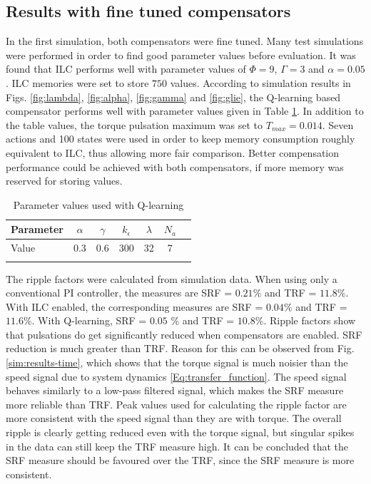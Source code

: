 \subsection{Results with fine tuned compensators} \label{Results with fine tuned compensators}
In the first simulation, both compensators were fine tuned. Many test simulations were performed in order to find good parameter values before evaluation. It was found that ILC performs well with parameter values of $\Phi = 9$, $\Gamma = 3$ and $\alpha = 0.05$. ILC memories were set to store $750$ values. According to simulation results in Figs. \ref{fig:lambda}, \ref{fig:alpha}, \ref{fig:gamma} and \ref{fig:glie}, the Q-learning based compensator performs well with parameter values given in Table  \ref{Tbl:Q-params}. In addition to the table values, the torque pulsation maximum was set to $T_{max}=0.014$. Seven actions and 100 states were used in order to keep memory consumption roughly equivalent to ILC, thus allowing more fair comparison. Better compensation performance could be achieved with both compensators, if more memory was reserved for storing values.

\begin{table}[b]
\caption{Parameter values used with Q-learning}
\centering
\begin{tabular}[t]{lcccccc}
\hline
Parameter    & $\alpha$ & $\gamma$ & $k_\epsilon$ & $\lambda$ & $N_a$\\
\hline
Value    & \num{0.3} & \num{0.6} &  \num{300} & \num{32} & \num{7}\\
\hline
\label{Tbl:Q-params}
\end{tabular}
\end{table}%

The ripple factors were calculated from simulation data. When using only a conventional PI controller, the measures are SRF = $0.21$\% and TRF = $11.8$\%. With ILC enabled, the corresponding measures are SRF = $0.04$\% and TRF = $11.6$\%. With Q-learning, SRF = $0.05$ \% and TRF = $10.8$\%. Ripple factors show that pulsations do get significantly reduced when compensators are enabled. SRF reduction is much greater than TRF. Reason for this can be observed from Fig. \ref{sim:results-time}, which shows that the torque signal is much noisier than the speed signal due to system dynamics \eqref{Eq:transfer_function}. The speed signal behaves similarly to a low-pass filtered signal, which makes the SRF measure more reliable than TRF. Peak values used for calculating the ripple factor are more consistent with the speed signal than they are with torque. The overall ripple is clearly getting reduced even with the torque signal, but singular spikes in the data can still keep the TRF measure high. It can be concluded that the SRF measure should be favoured over the TRF, since the SRF measure is more consistent.

